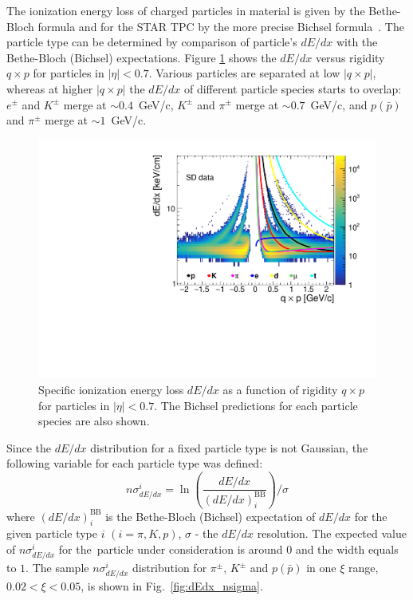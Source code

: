 The ionization energy loss of charged particles in material
is given by the Bethe-Bloch formula and for
the \ac{STAR} \ac{TPC} by the more precise Bichsel formula~\cite{Bichsel:2006cs}.
The particle type can be determined by comparison of particle's $dE/dx$ with the Bethe-Bloch (Bichsel) expectations.
Figure \ref{fig:star_dedx} shows the  $dE/dx$ versus rigidity $q\times p$ for particles in $|\eta| < 0.7$. Various particles are  separated at low $|q\times p|$, whereas at higher $|q\times p|$ the $dE/dx$ of different particle species starts to
overlap: $e^\pm$ and $K^\pm$ merge at $\sim0.4$~GeV/c, $K^\pm$ and
$\pi^\pm$ merge at $\sim0.7$~GeV/c, and $p(\bar{p})$ and $\pi^\pm$ merge
at $\sim1$~GeV/c. 
\begin{figure}[h!]
	\centering
	\includegraphics[width=0.8\linewidth, page=1]{chapters/chrgSTAR/img/dEdx/SDT_dEdx.pdf}
	\caption[Specific ionization
	energy loss $dE/dx$ as a function of rigidity $q\times p$ for particles
	in $|\eta| < 0.7$]{Specific ionization
		energy loss $dE/dx$ as a function of rigidity $q\times p$ for particles
		in $|\eta| < 0.7$. The Bichsel predictions for each particle species are also shown.}
	\label{fig:star_dedx}
\end{figure} 
\noindent Since the $dE/dx$ distribution for a fixed particle type
is not Gaussian, the following variable for each particle type was defined:
\begin{equation}
n\sigma^i_{dE/dx}=\ln\left(\frac{dE/dx}{(dE/dx)_i^\textrm{{BB}}}\right)/\sigma
\label{eq:nsigma}
\end{equation}
where $(dE/dx)_i^\textrm{{BB}}$ is the Bethe-Bloch (Bichsel) expectation
of $dE/dx$ for the given particle type $i$ $(i =
\pi, K, p)$, $\sigma$ - the $dE/dx$ resolution.
The expected value of $n\sigma^i_{dE/dx}$ for the~particle under consideration is around $0$  and the width equals to $1$. The sample $n\sigma^i_{dE/dx}$ distribution for $\pi^{\pm}$, $K^\pm$ and $p(\bar{p})$ in one $\xi$ range, $0.02 < \xi < 0.05$, is shown  in Fig.~\ref{fig:dEdx_nsigma}.
